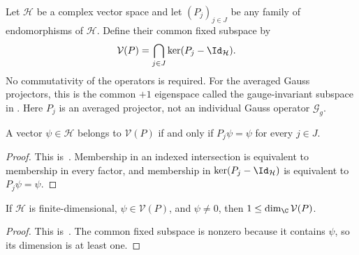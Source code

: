 \begin{definition}
    \label{def:mpug_common_fixed_subspace}
    \leanok
    Let $\mathcal H$ be a complex vector space and let $(P_j)_{j\in J}$ be any
    family of endomorphisms of $\mathcal H$. Define
    their common fixed subspace by
    \begin{align}
        \mathcal V(P)
         & =\bigcap_{j\in J}\ker(P_j-\Id_{\mathcal H}).
    \end{align}
    No commutativity of the operators is required. For the averaged Gauss
    projectors, this is the common $+1$ eigenspace called the gauge-invariant
    subspace in
    \cite[lines~4327--4335 and line~5198]{FrancoRubio2025MPUGauging}.
    Here $P_j$ is an averaged projector, not an individual Gauss operator
    $\mathcal G_g$.
\end{definition}

\begin{lemma}
    \label{thm:mpug_mem_common_fixed_subspace}
    \leanok
    A vector $\psi\in\mathcal H$ belongs to $\mathcal V(P)$ if and only if
    $P_j\psi=\psi$ for every $j\in J$.
\end{lemma}

\begin{proof}\leanok
    This is~\cite[``Membership in the common fixed
        subspace'']{QICLean2026Blueprint}.
    Membership in an indexed intersection is equivalent to membership in
    every factor, and membership in $\ker(P_j-\Id_{\mathcal H})$ is equivalent
    to $P_j\psi=\psi$.
\end{proof}

\begin{lemma}
    \label{thm:mpug_common_fixed_subspace_finrank}
    \leanok
    If $\mathcal H$ is finite-dimensional, $\psi\in\mathcal V(P)$, and
    $\psi\neq0$, then $1\leq\dim_{\C}\mathcal V(P)$.
\end{lemma}

\begin{proof}\leanok
    This is~\cite[``Nonzero-vector lower bound'']{QICLean2026Blueprint}.
    The common fixed subspace is nonzero because it contains $\psi$, so its
    dimension is at least one.
\end{proof}


